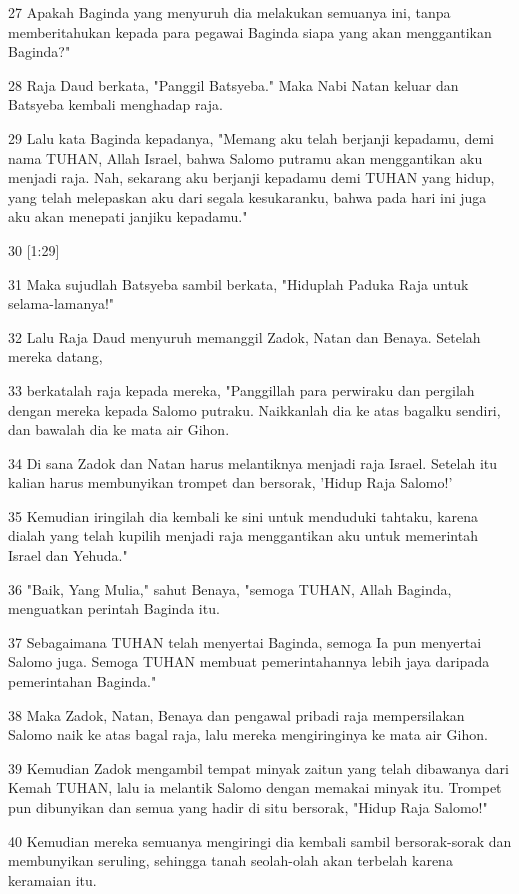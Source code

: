 \par 27 Apakah Baginda yang menyuruh dia melakukan semuanya ini, tanpa memberitahukan kepada para pegawai Baginda siapa yang akan menggantikan Baginda?"
\par 28 Raja Daud berkata, "Panggil Batsyeba." Maka Nabi Natan keluar dan Batsyeba kembali menghadap raja.
\par 29 Lalu kata Baginda kepadanya, "Memang aku telah berjanji kepadamu, demi nama TUHAN, Allah Israel, bahwa Salomo putramu akan menggantikan aku menjadi raja. Nah, sekarang aku berjanji kepadamu demi TUHAN yang hidup, yang telah melepaskan aku dari segala kesukaranku, bahwa pada hari ini juga aku akan menepati janjiku kepadamu."
\par 30 [1:29]
\par 31 Maka sujudlah Batsyeba sambil berkata, "Hiduplah Paduka Raja untuk selama-lamanya!"
\par 32 Lalu Raja Daud menyuruh memanggil Zadok, Natan dan Benaya. Setelah mereka datang,
\par 33 berkatalah raja kepada mereka, "Panggillah para perwiraku dan pergilah dengan mereka kepada Salomo putraku. Naikkanlah dia ke atas bagalku sendiri, dan bawalah dia ke mata air Gihon.
\par 34 Di sana Zadok dan Natan harus melantiknya menjadi raja Israel. Setelah itu kalian harus membunyikan trompet dan bersorak, 'Hidup Raja Salomo!'
\par 35 Kemudian iringilah dia kembali ke sini untuk menduduki tahtaku, karena dialah yang telah kupilih menjadi raja menggantikan aku untuk memerintah Israel dan Yehuda."
\par 36 "Baik, Yang Mulia," sahut Benaya, "semoga TUHAN, Allah Baginda, menguatkan perintah Baginda itu.
\par 37 Sebagaimana TUHAN telah menyertai Baginda, semoga Ia pun menyertai Salomo juga. Semoga TUHAN membuat pemerintahannya lebih jaya daripada pemerintahan Baginda."
\par 38 Maka Zadok, Natan, Benaya dan pengawal pribadi raja mempersilakan Salomo naik ke atas bagal raja, lalu mereka mengiringinya ke mata air Gihon.
\par 39 Kemudian Zadok mengambil tempat minyak zaitun yang telah dibawanya dari Kemah TUHAN, lalu ia melantik Salomo dengan memakai minyak itu. Trompet pun dibunyikan dan semua yang hadir di situ bersorak, "Hidup Raja Salomo!"
\par 40 Kemudian mereka semuanya mengiringi dia kembali sambil bersorak-sorak dan membunyikan seruling, sehingga tanah seolah-olah akan terbelah karena keramaian itu.
